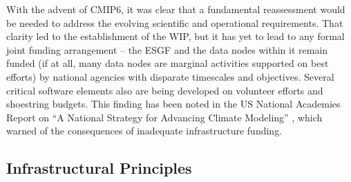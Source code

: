 \documentclass[gmd,manuscript]{copernicus}
\begin{document}
With the advent of CMIP6, it was clear that
a fundamental reassessment would be needed to address the evolving
scientific and operational requirements. That clarity led to the
establishment of the WIP, but it has yet to lead to any formal joint
funding arrangement -- the ESGF and the data nodes within it remain
funded (if at all, many data nodes are marginal activities supported
on best efforts) by national agencies with disparate timescales and
objectives. Several critical software elements also are being
developed on volunteer efforts and shoestring budgets. This finding
has been noted in the US National Academies Report on ``A National
Strategy for Advancing Climate Modeling'' \citep{ref:nasem2012}, which
warned of the consequences of inadequate infrastructure funding.

\subsection{Infrastructural Principles}
\label{sec:infra-principles}
\end{document}
